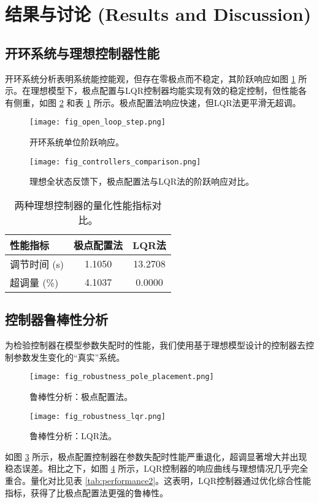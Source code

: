 \documentclass[12pt, a4paper]{article}
\begin{document}
\section{结果与讨论 (Results and Discussion)}

\subsection{开环系统与理想控制器性能}
开环系统分析表明系统能控能观，但存在零极点而不稳定，其阶跃响应如图 \ref{fig:open_loop} 所示。在理想模型下，极点配置与LQR控制器均能实现有效的稳定控制，但性能各有侧重，如图 \ref{fig:controllers_comparison} 和表 \ref{tab:performance1} 所示。极点配置法响应快速，但LQR法更平滑无超调。

\begin{figure}[htbp]
    \centering
    \texttt{[image: fig\_open\_loop\_step.png]}
    \caption{开环系统单位阶跃响应。}
    \label{fig:open_loop}
\end{figure}

\begin{figure}[htbp]
    \centering
    \texttt{[image: fig\_controllers\_comparison.png]}
    \caption{理想全状态反馈下，极点配置法与LQR法的阶跃响应对比。}
    \label{fig:controllers_comparison}
\end{figure}

\begin{table}[htbp]
    \centering
    \caption{两种理想控制器的量化性能指标对比。}
    \label{tab:performance1}
    \begin{tabular}{lcc}
        \toprule
        \textbf{性能指标} & \textbf{极点配置法} & \textbf{LQR法} \\
        \midrule
        调节时间 (s) & 1.1050 & 13.2708 \\
        超调量 (\%) & 4.1037 & 0.0000 \\
        \bottomrule
    \end{tabular}
\end{table}

\subsection{控制器鲁棒性分析}
为检验控制器在模型参数失配时的性能，我们使用基于理想模型设计的控制器去控制参数发生变化的“真实”系统。
\begin{figure}[htbp]
    \centering
    \texttt{[image: fig\_robustness\_pole\_placement.png]}
    \caption{鲁棒性分析：极点配置法。}
    \label{fig:robustness_pp}
\end{figure}
\begin{figure}[htbp]
    \centering
    \texttt{[image: fig\_robustness\_lqr.png]}
    \caption{鲁棒性分析：LQR法。}
    \label{fig:robustness_lqr}
\end{figure}
如图 \ref{fig:robustness_pp} 所示，极点配置控制器在参数失配时性能严重退化，超调显著增大并出现稳态误差。相比之下，如图 \ref{fig:robustness_lqr} 所示，LQR控制器的响应曲线与理想情况几乎完全重合。量化对比见表 \ref{tab:performance2}。这表明，LQR控制器通过优化综合性能指标，获得了比极点配置法更强的鲁棒性。
\end{document}
